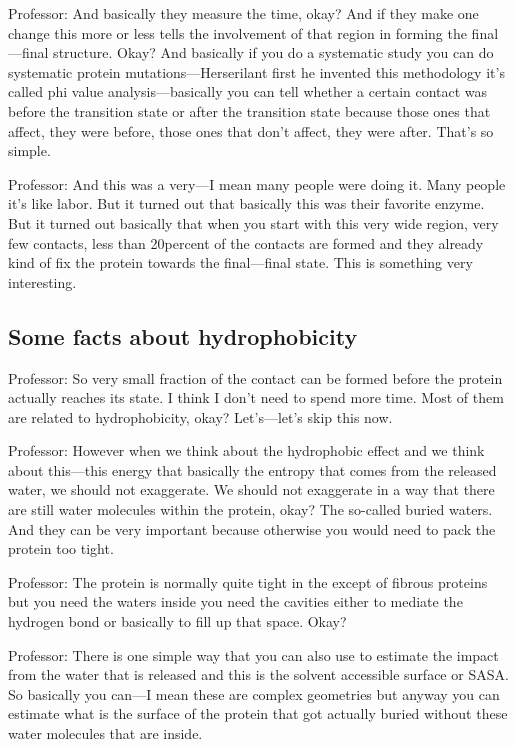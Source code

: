 Professor: And basically they measure the time, okay? And if they make one change this more or less tells the involvement of that region in forming the final—final structure. Okay? And basically if you do a systematic study you can do systematic protein mutations—Herserilant first he invented this methodology it’s called phi value analysis—basically you can tell whether a certain contact was before the transition state or after the transition state because those ones that affect, they were before, those ones that don’t affect, they were after. That’s so simple.

Professor: And this was a very—I mean many people were doing it. Many people it’s like labor. But it turned out that basically this was their favorite enzyme. But it turned out basically that when you start with this very wide region, very few contacts, less than 20percent of the contacts are formed and they already kind of fix the protein towards the final—final state. This is something very interesting.

\subsection{Some facts about hydrophobicity}
Professor: So very small fraction of the contact can be formed before the protein actually reaches its state. I think I don’t need to spend more time. Most of them are related to hydrophobicity, okay? Let’s—let’s skip this now.

Professor: However when we think about the hydrophobic effect and we think about this—this energy that basically the entropy that comes from the released water, we should not exaggerate. We should not exaggerate in a way that there are still water molecules within the protein, okay? The so-called buried waters. And they can be very important because otherwise you would need to pack the protein too tight.

Professor: The protein is normally quite tight in the except of fibrous proteins but you need the waters inside you need the cavities either to mediate the hydrogen bond or basically to fill up that space. Okay?

Professor: There is one simple way that you can also use to estimate the impact from the water that is released and this is the solvent accessible surface or SASA. So basically you can—I mean these are complex geometries but anyway you can estimate what is the surface of the protein that got actually buried without these water molecules that are inside.

